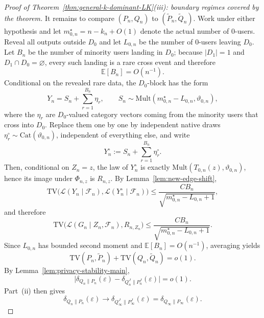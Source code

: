 \documentclass{article}
\newcommand{\TV}{\mathrm{TV}}
\newcommand{\Mult}{\mathrm{Mult}}
\newcommand{\Cat}{\mathrm{Cat}}
\newcommand{\E}{\mathbb E}
\newcommand{\1}{\mathbf 1}
\begin{document}
\begin{proof}[Proof of Theorem~\ref{thm:general-k-dominant-LK}(iii): boundary regimes covered by the theorem]
It remains to compare $(P_n,Q_n)$ to $(\widetilde P_n,\widetilde Q_n)$. Work under either hypothesis and let
$m_{0,n}^\star=n-k_n+O(1)$ denote the actual number of $0$-users. Reveal all outputs outside $D_0$ and let $L_{0,n}$
be the number of $0$-users leaving $D_0$. Let $B_n$ be the number of minority users landing in $D_0$; because
$|D_1|=1$ and $D_1\cap D_0=\varnothing$, every such landing is a rare cross event and therefore
\[
\E[B_n]=O(n^{-1}).
\]
Conditional on the revealed rare data, the $D_0$-block has the form
\[
Y_n=S_n+\sum_{r=1}^{B_n}\eta_r,
\qquad
S_n\sim \Mult(m_{0,n}^\star-L_{0,n},\vartheta_{0,n}),
\]
where the $\eta_r$ are $D_0$-valued category vectors coming from the minority users that cross into $D_0$.
Replace them one by one by independent native draws $\eta_r^\circ\sim \Cat(\vartheta_{0,n})$, independent of
everything else, and write
\[
Y_n^\circ:=S_n+\sum_{r=1}^{B_n}\eta_r^\circ.
\]
Then, conditional on $Z_n=z$, the law of $Y_n^\circ$ is exactly $\Mult(T_{0,n}(z),\vartheta_{0,n})$, hence its
image under $\Phi_{n,z}$ is $R_{n,z}$. By Lemma~\ref{lem:new-edge-shift},
\[
\TV\bigl(\mathcal L(Y_n\mid \mathcal F_n),\mathcal L(Y_n^\circ\mid \mathcal F_n)\bigr)
\le \frac{CB_n}{\sqrt{m_{0,n}^\star-L_{0,n}+1}},
\]
and therefore
\[
\TV\bigl(\mathcal L(G_n\mid Z_n,\mathcal F_n),R_{n,Z_n}\bigr)
\le \frac{CB_n}{\sqrt{m_{0,n}^\star-L_{0,n}+1}}.
\]
Since $L_{0,n}$ has bounded second moment and $\E[B_n]=O(n^{-1})$, averaging yields
\[
\TV(P_n,\widetilde P_n)+\TV(Q_n,\widetilde Q_n)=o(1).
\]
By Lemma~\ref{lem:privacy-stability-main},
\[
\bigl|\delta_{Q_n\|P_n}(\varepsilon)-\delta_{Q_n^J\|P_n^J}(\varepsilon)\bigr|=o(1).
\]
Part~(ii) then gives
\[
\delta_{Q_n\|P_n}(\varepsilon)\to
\delta_{Q_\infty^J\|P_\infty^J}(\varepsilon)
=
\delta_{Q_\infty\|P_\infty}(\varepsilon).
\]


\end{proof}
\end{document}
